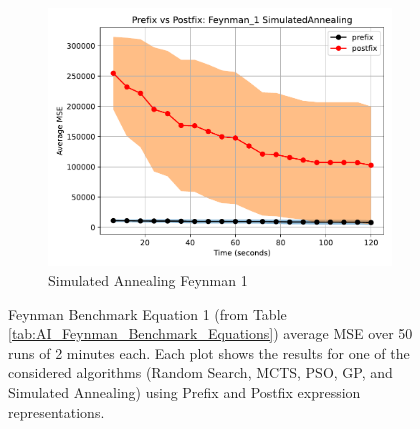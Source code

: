 \documentclass[12pt]{iopart}
\begin{document}
\begin{figure}
    \vspace{0.5cm}
    
    \begin{subfigure}[b]{0.4\textwidth}
        \includegraphics[width=\linewidth, keepaspectratio]{AIFeynman_Benchmarks/PrePostFeynman_1SimulatedAnnealing.pdf}
        \caption{Simulated Annealing Feynman 1}
        \label{subfig:feynman_1_SA}
    \end{subfigure}
    
    \caption{Feynman Benchmark Equation 1 (from Table \ref{tab:AI_Feynman_Benchmark_Equations}) average MSE over 50 runs of 2 minutes each. Each plot shows the results for one of the considered algorithms (Random Search, MCTS, PSO, GP, and Simulated Annealing) using Prefix and Postfix expression representations.}
    \label{fig:AIFeynman_1_Benchmarks}
\end{figure}
\end{document}
